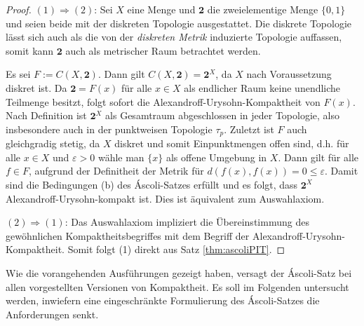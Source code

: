\begin{proof}
  $(1) \Rightarrow (2)$: Sei $X$ eine Menge und $\mathbf{2}$ die zweielementige Menge $\{0,1\}$ und seien beide mit der diskreten Topologie ausgestattet. 
  Die diskrete Topologie lässt sich auch als die von der \textit{diskreten Metrik} induzierte Topologie auffassen, somit kann $\mathbf{2}$ auch als metrischer Raum betrachtet werden. 

  Es sei $F := C(X, \mathbf{2})$.
  Dann gilt $C(X, \mathbf{2}) = \mathbf{2}^X$, da $X$ nach Voraussetzung diskret ist.
  Da $\mathbf{2} = F(x)$ für alle $x \in X$ als endlicher Raum keine unendliche Teilmenge besitzt, folgt sofort die Alexandroff-Urysohn-Kompaktheit von $F(x)$.
  Nach Definition ist $\mathbf{2}^X$ als Gesamtraum abgeschlossen in jeder Topologie, also insbesondere auch in der punktweisen Topologie $\tau_p$.
  Zuletzt ist $F$ auch gleichgradig stetig, da $X$ diskret und somit Einpunktmengen offen sind, d.h. für alle $x \in X$ und $\varepsilon > 0$ wähle man $\{x\}$ als offene Umgebung in $X$. Dann gilt für alle $f \in F$, aufgrund der Definitheit der Metrik für  $d(f(x),f(x)) = 0 \leq \varepsilon$.
  Damit sind die Bedingungen (b) des Áscoli-Satzes erfüllt und es folgt, dass $\mathbf{2}^X$ Alexandroff-Urysohn-kompakt ist. Dies ist äquivalent zum Auswahlaxiom.

  $(2)\Rightarrow(1)$: Das Auswahlaxiom impliziert die Übereinstimmung des gewöhnlichen Kompaktheitsbegriffes mit dem Begriff der Alexandroff-Urysohn-Kompaktheit. Somit folgt (1) direkt aus Satz \ref{thm:ascoliPIT}.
\end{proof}

Wie die vorangehenden Ausführungen gezeigt haben, versagt der Áscoli-Satz bei allen vorgestellten Versionen von Kompaktheit. Es soll im Folgenden untersucht werden, inwiefern eine eingeschränkte Formulierung des Áscoli-Satzes die Anforderungen senkt.

